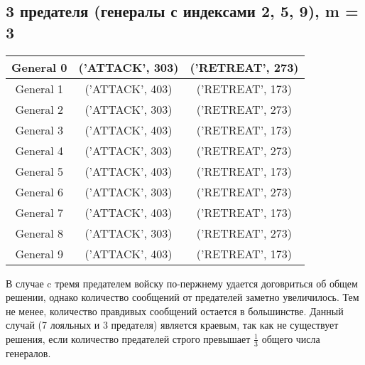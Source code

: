 \documentclass[12pt,a4paper]{article}
\begin{document}
            \subsection{3 предателя (генералы с индексами 2, 5, 9), m = 3}
                \begin{center}
                    \begin{tabular}{|c|c|c|}
                        \hline
                        General 0 & ('ATTACK', 303) & ('RETREAT', 273) \\ \hline
                        General 1 & ('ATTACK', 403) & ('RETREAT', 173) \\ \hline
                        General 2 & ('ATTACK', 303) & ('RETREAT', 273) \\ \hline
                        General 3 & ('ATTACK', 403) & ('RETREAT', 173) \\ \hline
                        General 4 & ('ATTACK', 303) & ('RETREAT', 273) \\ \hline
                        General 5 & ('ATTACK', 403) & ('RETREAT', 173) \\ \hline
                        General 6 & ('ATTACK', 303) & ('RETREAT', 273) \\ \hline
                        General 7 & ('ATTACK', 403) & ('RETREAT', 173) \\ \hline
                        General 8 & ('ATTACK', 303) & ('RETREAT', 273) \\ \hline
                        General 9 & ('ATTACK', 403) & ('RETREAT', 173) \\ \hline
                    \end{tabular}
            \end{center}
            В случае c тремя предателем войску по-пержнему удается договриться об общем решении, однако количество сообщений от предателей заметно увеличилось. Тем не менее, количество правдивых сообщений остается в большинстве. Данный случай (7 лояльных и 3 предателя) является краевым, так как не существует решения, если количество предателей строго превышает $\frac{1}{3}$ общего числа генералов.
\end{document}
